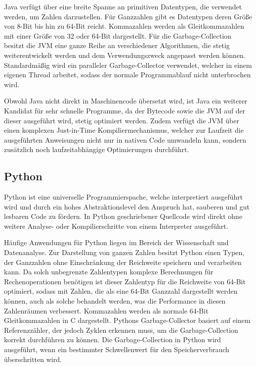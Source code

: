 \documentclass[11pt, parskip=half]{scrartcl}       %
\begin{document}
Java verfügt über eine breite Spanne an primitiven Datentypen, die verwendet werden, um Zahlen darzustellen.
Für Ganzzahlen gibt es Datentypen deren Größe von 8-Bit bis hin zu 64-Bit reicht.
Kommazahlen werden als Gleitkommazahlen mit einer Größe von 32 oder 64-Bit dargestellt.
Für die Garbage-Collection besitzt die JVM eine ganze Reihe an verschiedener Algorithmen, die stetig weiterentwickelt werden und dem Verwendungszweck angepasst werden können.
Standardmäßig wird ein paralleler Garbage-Collector verwendet, welcher in einem eigenen Thread arbeitet, sodass der normale Programmablauf nicht unterbrochen wird.

Obwohl Java nicht direkt in Maschinencode übersetzt wird, ist Java ein weiterer Kandidat für sehr schnelle Programme, da der Bytecode sowie die JVM auf der dieser ausgeführt wird, stetig optimiert werden.
Zudem verfügt die JVM über einen komplexen Just-in-Time Kompiliermechanismus, welcher zur Laufzeit die ausgeführten Anweisungen nicht nur in nativen Code umwandeln kann, sondern zusätzlich noch laufzeitabhängige Optimierungen durchführt.


\subsection{Python}

Python ist eine universelle Programmierspache, welche interpretiert ausgeführt wird und durch ein hohes Abstraktionslevel den Anspruch hat, sauberen und gut lesbaren Code zu fördern.
In Python geschriebener Quellcode wird direkt ohne weitere Analyse- oder Kompilierschritte von einem Interpreter ausgeführt.

Häufige Anwendungen für Python liegen im Bereich der Wissenschaft und Datenanalyse.
Zur Darstellung von ganzen Zahlen besitzt Python einen Typen, der Ganzzahlen ohne Einschränkung der Reichweite speichern und verarbeiten kann.
Da solch unbegrenzte Zahlentypen komplexe Berechnungen für Rechenoperationen benötigen ist dieser Zahlentyp für die Reichweite von 64-Bit optimiert, sodass mit Zahlen, die als eine 64-Bit Ganzzahl dargestellt werden können, auch als solche behandelt werden, was die Performance in diesen Zahlenräumen verbessert.
Kommazahlen werden als normale 64-Bit Gleitkommazahlen in C dargestellt.
Pythons Garbage-Collector basiert auf einem Referenzzähler, der jedoch Zyklen erkennen muss, um die Garbage-Collection korrekt durchführen zu können.
Die Garbage-Collection in Python wird ausgeführt, wenn ein bestimmter Schwellenwert für den Speicherverbrauch überschritten wird.
\end{document}
